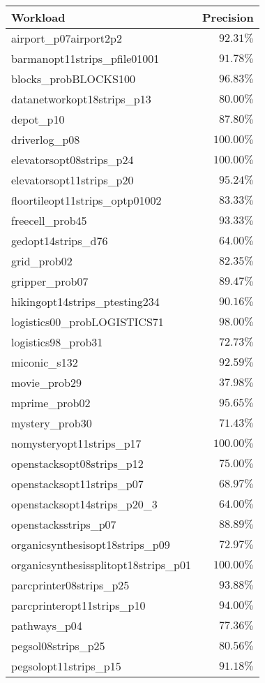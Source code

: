 \begin{tabular}{lr}
\toprule
Workload & Precision \\
\midrule
airport\_p07airport2p2 & $92.31\%$ \\
barmanopt11strips\_pfile01001 & $91.78\%$ \\
blocks\_probBLOCKS100 & $96.83\%$ \\
datanetworkopt18strips\_p13 & $80.00\%$ \\
depot\_p10 & $87.80\%$ \\
driverlog\_p08 & $100.00\%$ \\
elevatorsopt08strips\_p24 & $100.00\%$ \\
elevatorsopt11strips\_p20 & $95.24\%$ \\
floortileopt11strips\_optp01002 & $83.33\%$ \\
freecell\_prob45 & $93.33\%$ \\
gedopt14strips\_d76 & $64.00\%$ \\
grid\_prob02 & $82.35\%$ \\
gripper\_prob07 & $89.47\%$ \\
hikingopt14strips\_ptesting234 & $90.16\%$ \\
logistics00\_probLOGISTICS71 & $98.00\%$ \\
logistics98\_prob31 & $72.73\%$ \\
miconic\_s132 & $92.59\%$ \\
movie\_prob29 & $37.98\%$ \\
mprime\_prob02 & $95.65\%$ \\
mystery\_prob30 & $71.43\%$ \\
nomysteryopt11strips\_p17 & $100.00\%$ \\
openstacksopt08strips\_p12 & $75.00\%$ \\
openstacksopt11strips\_p07 & $68.97\%$ \\
openstacksopt14strips\_p20\_3 & $64.00\%$ \\
openstacksstrips\_p07 & $88.89\%$ \\
organicsynthesisopt18strips\_p09 & $72.97\%$ \\
organicsynthesissplitopt18strips\_p01 & $100.00\%$ \\
parcprinter08strips\_p25 & $93.88\%$ \\
parcprinteropt11strips\_p10 & $94.00\%$ \\
pathways\_p04 & $77.36\%$ \\
pegsol08strips\_p25 & $80.56\%$ \\
pegsolopt11strips\_p15 & $91.18\%$ \\

\end{tabular}
